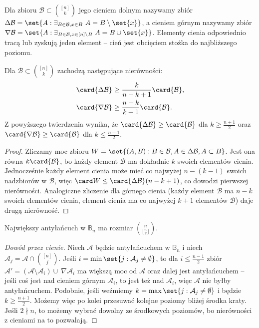 \begin{definition}
	Dla zbioru $\mathcal B \subset \displaystyle\binom{[n]}{k}$ jego cieniem
	dolnym nazywamy zbiór $\Delta\mathcal B = \set{A : \exists_{B\in\mathcal B,
				x\in B} \ A=B\setminus\set{x}}$, a cieniem górnym nazywamy zbiór
	$\nabla\mathcal B = \set{A : \exists_{B\in\mathcal B, x\in [n]\setminus B} \
			A=B\cup\set{x}}$. Elementy cienia odpowiednio tracą lub zyskują jeden element
	-- cień jest obcięciem stożka do najbliższego poziomu.
\end{definition}

\begin{theorem}
	Dla $\mathcal B \subset \displaystyle\binom{[n]}{k}$ zachodzą następujące nierówności:
	\begin{align*}
		\card{\Delta\mathcal B} & \ge \frac k{n-k+1}\card{\mathcal B},   \\
		\card{\nabla\mathcal B} & \ge \frac {n-k}{k+1}\card{\mathcal B}. \\
	\end{align*}
	Z powyższego twierdzenia wynika, że $\card{\Delta\mathcal B} \ge \card{\mathcal B}$ dla $k \ge
		\frac {n+1}2$ oraz $\card{\nabla\mathcal B} \ge \card{\mathcal B}$ dla $k \le \frac {n-1}2$.
\end{theorem}
\begin{proof}
	Zliczamy moc zbioru
	$W = \set{(A,B) : B\in\mathcal B, A\in\Delta\mathcal B, A\subset B}$.
	Jest ona równa $k\card{\mathcal B}$, bo każdy element $\mathcal B$ ma dokładnie $k$
	swoich elementów cienia. Jednocześnie każdy element cienia może mieć co najwyżej
	$n-(k-1)$ swoich nadzbiorów w $\mathcal B$, więc $\card W \le \card{\Delta\mathcal B}(n-k+1)$,
	co dowodzi pierwszej nierówności.
	Analogiczne zliczenie dla górnego cienia (każdy element $\mathcal B$ ma $n-k$
	swoich elementów cienia, element cienia ma co najwyżej $k+1$ elementów
	$\mathcal B$) daje drugą nierówność.
\end{proof}

\begin{theorem}
	Największy antyłańcuch w $\mathbb B_n$ ma rozmiar $\binom{n}{\lfloor \frac n2
			\rfloor}$.
\end{theorem}
\begin{proof}[Dowód przez cienie]
	Niech $\mathcal A$ będzie antyłańcuchem w $\mathbb B_n$ i niech $\mathcal A_j
		= \mathcal A \cap \binom{[n]}{j}$. Jeśli $i = \min\set{j : \mathcal
			A_j\ne\emptyset}$, to dla $i\le \frac{n-1}2$ zbiór $\mathcal A' = (\mathcal
		A\setminus \mathcal A_i)\cup \ \nabla\mathcal A_i$ ma większą moc od
	$\mathcal{A}$ oraz dalej jest antyłańcuchem -- jeśli coś jest nad cieniem
	górnym $\mathcal A_i$, to jest też nad $\mathcal A_i$, więc $\mathcal A$ nie
	byłby antyłańcuchem. Podobnie, jeśli weźmiemy $k = \max\set{j : \mathcal
			A_j\ne\emptyset}$ i będzie $k\ge \frac{n+1}2$. Możemy więc po kolei przesuwać
	kolejne poziomy bliżej środka kraty. Jeśli $2\nmid n$, to możemy wybrać
	dowolny ze środkowych poziomów, bo nierówności z cieniami na to pozwalają.
\end{proof}

